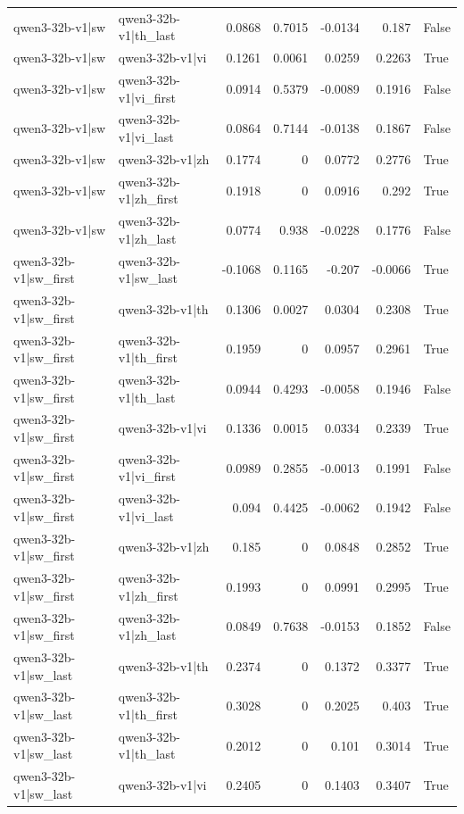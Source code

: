 \begin{table}
\begin{tabular}{l l r r r r l}
qwen3-32b-v1|sw & qwen3-32b-v1|th_last & 0.0868 & 0.7015 & -0.0134 & 0.187 & False \\
qwen3-32b-v1|sw & qwen3-32b-v1|vi & 0.1261 & 0.0061 & 0.0259 & 0.2263 & True \\
qwen3-32b-v1|sw & qwen3-32b-v1|vi_first & 0.0914 & 0.5379 & -0.0089 & 0.1916 & False \\
qwen3-32b-v1|sw & qwen3-32b-v1|vi_last & 0.0864 & 0.7144 & -0.0138 & 0.1867 & False \\
qwen3-32b-v1|sw & qwen3-32b-v1|zh & 0.1774 & 0 & 0.0772 & 0.2776 & True \\
qwen3-32b-v1|sw & qwen3-32b-v1|zh_first & 0.1918 & 0 & 0.0916 & 0.292 & True \\
qwen3-32b-v1|sw & qwen3-32b-v1|zh_last & 0.0774 & 0.938 & -0.0228 & 0.1776 & False \\
qwen3-32b-v1|sw_first & qwen3-32b-v1|sw_last & -0.1068 & 0.1165 & -0.207 & -0.0066 & True \\
qwen3-32b-v1|sw_first & qwen3-32b-v1|th & 0.1306 & 0.0027 & 0.0304 & 0.2308 & True \\
qwen3-32b-v1|sw_first & qwen3-32b-v1|th_first & 0.1959 & 0 & 0.0957 & 0.2961 & True \\
qwen3-32b-v1|sw_first & qwen3-32b-v1|th_last & 0.0944 & 0.4293 & -0.0058 & 0.1946 & False \\
qwen3-32b-v1|sw_first & qwen3-32b-v1|vi & 0.1336 & 0.0015 & 0.0334 & 0.2339 & True \\
qwen3-32b-v1|sw_first & qwen3-32b-v1|vi_first & 0.0989 & 0.2855 & -0.0013 & 0.1991 & False \\
qwen3-32b-v1|sw_first & qwen3-32b-v1|vi_last & 0.094 & 0.4425 & -0.0062 & 0.1942 & False \\
qwen3-32b-v1|sw_first & qwen3-32b-v1|zh & 0.185 & 0 & 0.0848 & 0.2852 & True \\
qwen3-32b-v1|sw_first & qwen3-32b-v1|zh_first & 0.1993 & 0 & 0.0991 & 0.2995 & True \\
qwen3-32b-v1|sw_first & qwen3-32b-v1|zh_last & 0.0849 & 0.7638 & -0.0153 & 0.1852 & False \\
qwen3-32b-v1|sw_last & qwen3-32b-v1|th & 0.2374 & 0 & 0.1372 & 0.3377 & True \\
qwen3-32b-v1|sw_last & qwen3-32b-v1|th_first & 0.3028 & 0 & 0.2025 & 0.403 & True \\
qwen3-32b-v1|sw_last & qwen3-32b-v1|th_last & 0.2012 & 0 & 0.101 & 0.3014 & True \\
qwen3-32b-v1|sw_last & qwen3-32b-v1|vi & 0.2405 & 0 & 0.1403 & 0.3407 & True \\

\end{tabular}
\end{table}
